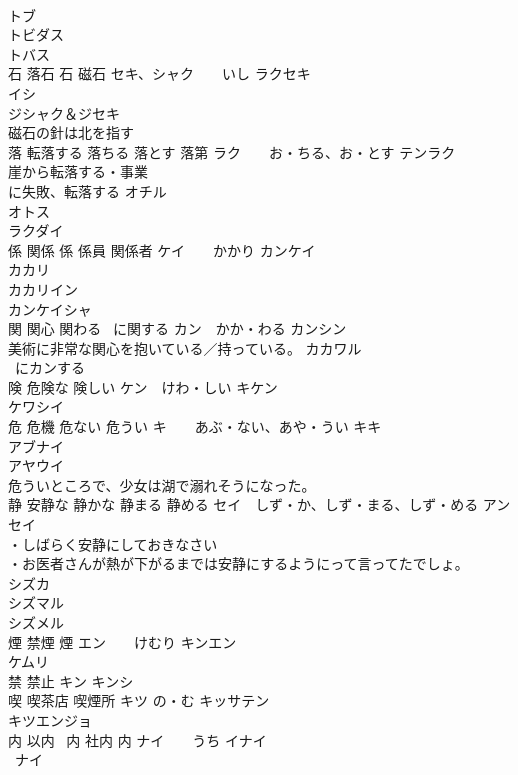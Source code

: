 \documentclass[8pt]{extreport}
\begin{document}
\begin{CJK}{UTF8}{min}
\\	トブ 
\\	トビダス 
\\	トバス 
\\	石 落石 石 磁石	セキ、シャク　　いし ラクセキ 
\\	イシ 
\\	ジシャク＆ジセキ 
\\	磁石の針は北を指す
\\	落 転落する 落ちる 落とす 落第	ラク　　お・ちる、お・とす テンラク 
\\	崖から転落する・事業
\\	に失敗、転落する オチル 
\\	オトス 
\\	ラクダイ 
\\	係 関係 係 係員 関係者	ケイ　　かかり カンケイ 
\\	カカリ 
\\	カカリイン 
\\	カンケイシャ 
\\	関 関心 関わる ~に関する	カン　かか・わる カンシン 
\\	美術に非常な関心を抱いている／持っている。 カカワル 
\\	~にカンする 
\\	険 危険な 険しい	ケン　けわ・しい キケン　
\\	ケワシイ 
\\	危 危機 危ない 危うい	キ　　あぶ・ない、あや・うい キキ 
\\	アブナイ 
\\	アヤウイ 
\\	危ういところで、少女は湖で溺れそうになった。
\\	静 安静な 静かな 静まる 静める	セイ　しず・か、しず・まる、しず・める アンセイ 
\\	・しばらく安静にしておきなさい 
\\	・お医者さんが熱が下がるまでは安静にするようにって言ってたでしょ。
\\	シズカ 
\\	シズマル 
\\	シズメル 
\\	煙 禁煙 煙	エン　　けむり キンエン　
\\	ケムリ 
\\	禁 禁止	キン キンシ 
\\	喫 喫茶店 喫煙所	キツ の・む キッサテン 
\\	キツエンジョ 
\\	内 以内 ~内 社内 内	ナイ　　うち イナイ 
\\	~ナイ 

\end{CJK}
\end{document}
